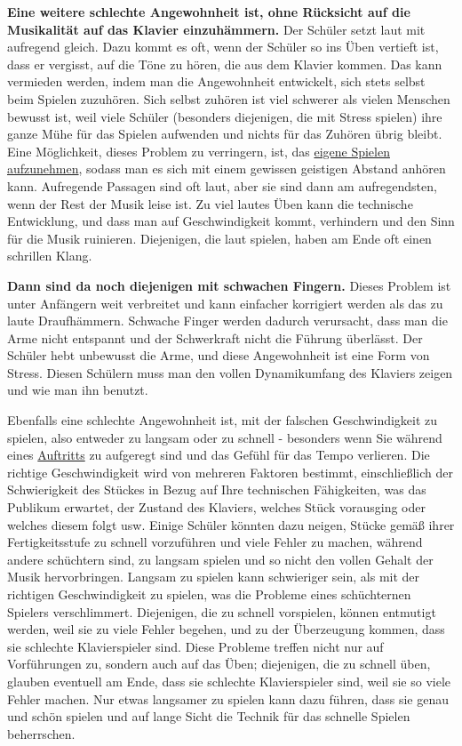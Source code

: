 \textbf{Eine weitere schlechte Angewohnheit ist, ohne Rücksicht auf die Musikalität auf das Klavier einzuhämmern.}
Der Schüler setzt laut mit aufregend gleich.
Dazu kommt es oft, wenn der Schüler so ins Üben vertieft ist, dass er vergisst, auf die Töne zu hören, die aus dem Klavier kommen.
Das kann vermieden werden, indem man die Angewohnheit entwickelt, sich stets selbst beim Spielen zuzuhören.
Sich selbst zuhören ist viel schwerer als vielen Menschen bewusst ist, weil viele Schüler (besonders diejenigen, die mit Stress spielen) ihre ganze Mühe für das Spielen aufwenden und nichts für das Zuhören übrig bleibt.
Eine Möglichkeit, dieses Problem zu verringern, ist, das \hyperlink{c1iii13}{eigene Spielen aufzunehmen}, sodass man es sich mit einem gewissen geistigen Abstand anhören kann.
Aufregende Passagen sind oft laut, aber sie sind dann am aufregendsten, wenn der Rest der Musik leise ist.
Zu viel lautes Üben kann die technische Entwicklung, und dass man auf Geschwindigkeit kommt, verhindern und den Sinn für die Musik ruinieren.
Diejenigen, die laut spielen, haben am Ende oft einen schrillen Klang.

\textbf{Dann sind da noch diejenigen mit schwachen Fingern.}
Dieses Problem ist unter Anfängern weit verbreitet und kann einfacher korrigiert werden als das zu laute Draufhämmern.
Schwache Finger werden dadurch verursacht, dass man die Arme nicht entspannt und der Schwerkraft nicht die Führung überlässt.
Der Schüler hebt unbewusst die Arme, und diese Angewohnheit ist eine Form von Stress.
Diesen Schülern muss man den vollen Dynamikumfang des Klaviers zeigen und wie man ihn benutzt.

Ebenfalls eine schlechte Angewohnheit ist, mit der falschen Geschwindigkeit zu spielen, also entweder zu langsam oder zu schnell - besonders wenn Sie während eines \hyperlink{c1iii14}{Auftritts} zu aufgeregt sind und das Gefühl für das Tempo verlieren.
Die richtige Geschwindigkeit wird von mehreren Faktoren bestimmt, einschließlich der Schwierigkeit des Stückes in Bezug auf Ihre technischen Fähigkeiten, was das Publikum erwartet, der Zustand des Klaviers, welches Stück vorausging oder welches diesem folgt usw.
Einige Schüler könnten dazu neigen, Stücke gemäß ihrer Fertigkeitsstufe zu schnell vorzuführen und viele Fehler zu machen, während andere schüchtern sind, zu langsam spielen und so nicht den vollen Gehalt der Musik hervorbringen.
Langsam zu spielen kann schwieriger sein, als mit der richtigen Geschwindigkeit zu spielen, was die Probleme eines schüchternen Spielers verschlimmert.
Diejenigen, die zu schnell vorspielen, können entmutigt werden, weil sie zu viele Fehler begehen, und zu der Überzeugung kommen, dass sie schlechte Klavierspieler sind.
Diese Probleme treffen nicht nur auf Vorführungen zu, sondern auch auf das Üben;
diejenigen, die zu schnell üben, glauben eventuell am Ende, dass sie schlechte Klavierspieler sind, weil sie so viele Fehler machen.
Nur etwas langsamer zu spielen kann dazu führen, dass sie genau und schön spielen und auf lange Sicht die Technik für das schnelle Spielen beherrschen.

